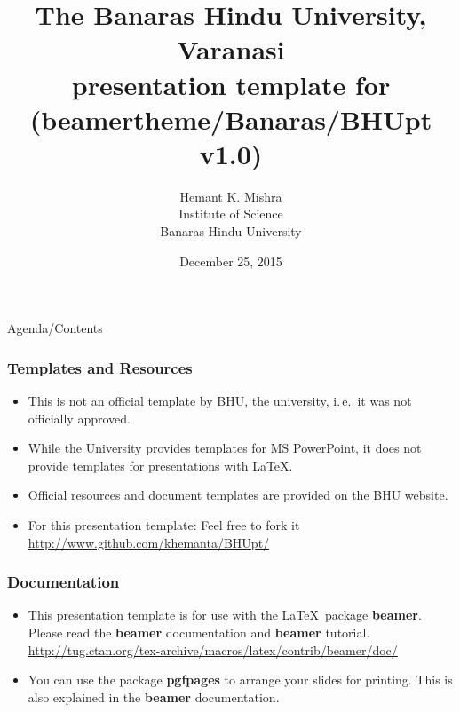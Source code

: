 \documentclass[]{beamer} %
\author[]{\small{Hemant K. Mishra} \\ \tiny{Institute of Science} \\ \tiny{Banaras Hindu University} }%
\title[]{The Banaras Hindu University, Varanasi \\ presentation template for \LaTeXe \\ (beamertheme/Banaras/BHUpt v1.0)}
\date{December 25, 2015} %
\begin{document}
\frame{\maketitle}
\begin{frame}{Agenda/Contents}%
\tableofcontents
\end{frame}



\begin{frame}
\frametitle{Templates and Resources}
	\begin{itemize}
	\item This is not an official template by BHU, the university,	i.\,e.\ it was not officially approved.
	\item While the University provides templates for MS PowerPoint, it does not provide templates for presentations with \LaTeX.
	\item Official resources and document templates are provided on the BHU website.
    \item For this presentation template: Feel free to fork it\\ 	
    {\small \url{http://www.github.com/khemanta/BHUpt/}} \\
	\end{itemize}
\end{frame}

\begin{frame}
\frametitle{Documentation}
	\begin{itemize}
	\item This presentation template is for use
	with the \LaTeX\ package \textbf{beamer}.
	Please read the \textbf{beamer} documentation
	and  \textbf{beamer} tutorial.\\	
    {\tiny \url{http://tug.ctan.org/tex-archive/macros/latex/contrib/beamer/doc/}}
	\item You can use the package \textbf{pgfpages}
	to arrange your slides for printing. This is also explained
	in the \textbf{beamer} documentation.
	\end{itemize}
\end{frame}
\end{document}
